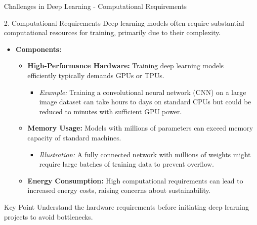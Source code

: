 \documentclass[aspectratio=169]{beamer}
\begin{document}
\begin{frame}[fragile]{Challenges in Deep Learning - Computational Requirements}
    \begin{block}{2. Computational Requirements}
        Deep learning models often require substantial computational resources for training, primarily due to their complexity.
    \end{block}
    
    \begin{itemize}
        \item \textbf{Components:}
        \begin{itemize}
            \item \textbf{High-Performance Hardware:} Training deep learning models efficiently typically demands GPUs or TPUs.
            \begin{itemize}
                \item \textit{Example:} Training a convolutional neural network (CNN) on a large image dataset can take hours to days on standard CPUs but could be reduced to minutes with sufficient GPU power.
            \end{itemize}
            \item \textbf{Memory Usage:} Models with millions of parameters can exceed memory capacity of standard machines.
            \begin{itemize}
                \item \textit{Illustration:} A fully connected network with millions of weights might require large batches of training data to prevent overflow.
            \end{itemize}
            \item \textbf{Energy Consumption:} High computational requirements can lead to increased energy costs, raising concerns about sustainability.
        \end{itemize}
    \end{itemize}
    
    \begin{block}{Key Point}
        Understand the hardware requirements before initiating deep learning projects to avoid bottlenecks.
    \end{block}
\end{frame}
\end{document}
